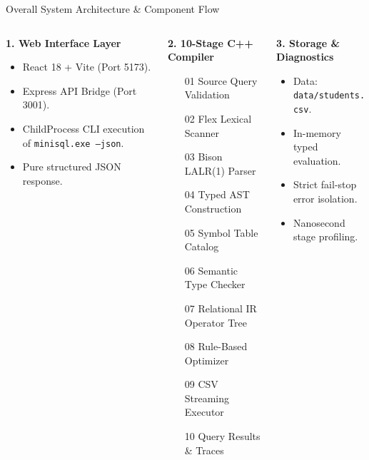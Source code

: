 \documentclass[aspectratio=169,10pt]{beamer}
\begin{document}
\begin{frame}{Overall System Architecture \& Component Flow}
    \begin{columns}[T]
        \begin{column}{0.32\textwidth}
            \textbf{1. Web Interface Layer}
            \begin{itemize}\footnotesize
                \item React 18 + Vite (Port 5173).
                \item Express API Bridge (Port 3001).
                \item ChildProcess CLI execution of \texttt{minisql.exe --json}.
                \item Pure structured JSON response.
            \end{itemize}
        \end{column}
        \begin{column}{0.35\textwidth}
            \textbf{2. 10-Stage C++ Compiler}
            \begin{itemize}\footnotesize
                \item [01] Source Query Validation
                \item [02] Flex Lexical Scanner
                \item [03] Bison LALR(1) Parser
                \item [04] Typed AST Construction
                \item [05] Symbol Table Catalog
                \item [06] Semantic Type Checker
                \item [07] Relational IR Operator Tree
                \item [08] Rule-Based Optimizer
                \item [09] CSV Streaming Executor
                \item [10] Query Results \& Traces
            \end{itemize}
        \end{column}
        \begin{column}{0.30\textwidth}
            \textbf{3. Storage \& Diagnostics}
            \begin{itemize}\footnotesize
                \item Data: \texttt{data/students.csv}.
                \item In-memory typed evaluation.
                \item Strict fail-stop error isolation.
                \item Nanosecond stage profiling.
            \end{itemize}
        \end{column}
    \end{columns}
\end{frame}
\end{document}
